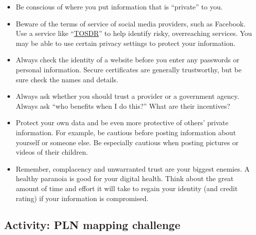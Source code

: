 \documentclass[
]{book}
\providecommand{\tightlist}{%
  \setlength{\itemsep}{0pt}\setlength{\parskip}{0pt}}
\theoremstyle{definition}
\theoremstyle{definition}
\theoremstyle{definition}
\theoremstyle{definition}
\theoremstyle{remark}
\begin{document}
\begin{itemize}
\tightlist
\item
  Be conscious of where you put information that is ``private'' to you.\\
\item
  Beware of the terms of service of social media providers, such as Facebook. Use a service like ``\href{https://tosdr.org/}{TOSDR}'' to help identify risky, overreaching services. You may be able to use certain privacy settings to protect your information.\\
\item
  Always check the identity of a website before you enter any passwords or personal information. Secure certificates are generally trustworthy, but be sure check the names and details.\\
\item
  Always ask whether you should trust a provider or a government agency. Always ask ``who benefits when I do this?'' What are their incentives?\\
\item
  Protect your own data and be even more protective of others' private information. For example, be cautious before posting information about yourself or someone else. Be especially cautious when posting pictures or videos of their children.\\
\item
  Remember, complacency and unwarranted trust are your biggest enemies. A healthy paranoia is good for your digital health. Think about the great amount of time and effort it will take to regain your identity (and credit rating) if your information is compromised.
\end{itemize}

\hypertarget{activity-pln-mapping-challenge}{%
\subsection*{Activity: PLN mapping challenge}\label{activity-pln-mapping-challenge}}
\end{document}
